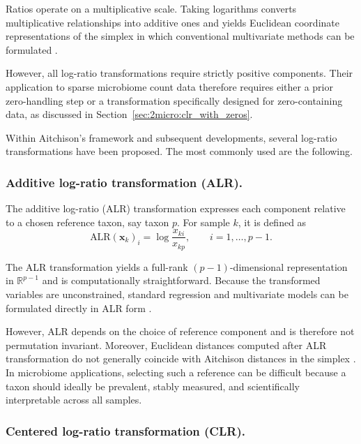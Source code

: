 Ratios operate on a multiplicative scale. 
Taking logarithms converts multiplicative relationships into additive ones and yields Euclidean coordinate representations of the simplex in which conventional multivariate methods can be formulated \citep{aitchison1986statistical,greenacre2021compositional}. 

However, all log-ratio transformations require strictly positive components. Their application to sparse microbiome count data therefore requires either a prior zero-handling step or a transformation specifically designed for zero-containing data, as discussed in Section~\ref{sec:2micro:clr_with_zeros}.

Within Aitchison's framework and subsequent developments, several log-ratio transformations have been proposed. The most commonly used are the following.

\subsubsection*{Additive log-ratio transformation (ALR).}

The additive log-ratio (ALR) transformation expresses each component relative to a chosen reference taxon, say taxon $p$. 
For sample $k$, it is defined as
\begin{equation}
\label{eq:2micro:ALR}
\text{ALR}(\mathbf{x}_k)_i = \log \frac{x_{ki}}{x_{kp}},
\qquad i = 1,\dots,p-1.
\end{equation}

The ALR transformation yields a full-rank $(p-1)$-dimensional representation in $\mathbb{R}^{p-1}$ and is computationally straightforward. 
Because the transformed variables are unconstrained, standard regression and multivariate models can be formulated directly in ALR form \citep{aitchison1982statistical,aitchison1986statistical}. 

However, ALR depends on the choice of reference component and is therefore not permutation invariant. Moreover, Euclidean distances computed after ALR transformation do not generally coincide with Aitchison distances in the simplex \citep{aitchison1986statistical}. In microbiome applications, selecting such a reference can be difficult because a taxon should ideally be prevalent, stably measured, and scientifically interpretable across all samples.

\subsubsection*{Centered log-ratio transformation (CLR).}

